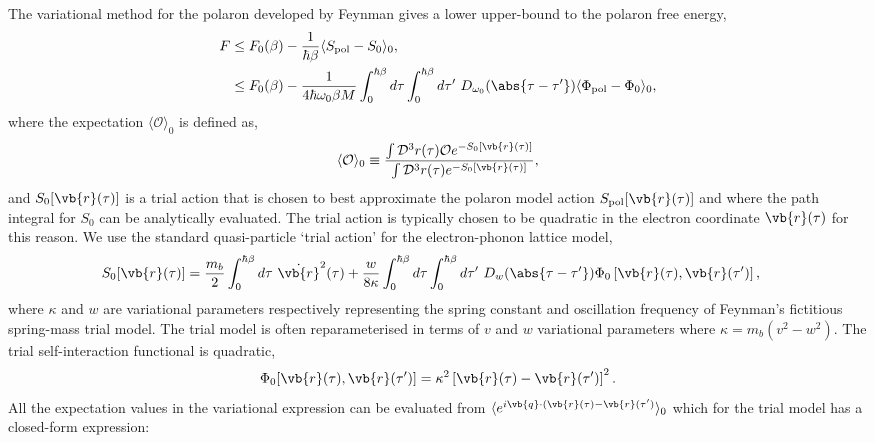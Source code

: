 The variational method for the polaron developed by Feynman gives a lower upper-bound to the polaron free energy,
\begin{equation}
    \begin{aligned}
         F &\leq F_0(\beta) - \frac{1}{\hbar\beta} \langle S_{\text{pol}} - S_{0} \rangle_0 , \\
         &\leq F_0(\beta) -\frac{1}{4\hbar\omega_0\beta M} \int_0^{\hbar\beta} d\tau \int_0^{\hbar\beta} d\tau'\ D_{\omega_0}(\abs{\tau - \tau'}) \langle \Phi_{\text{pol}} - \Phi_0 \rangle_0 ,
    \end{aligned}
\end{equation}
where the expectation $\langle \mathcal{O} \rangle_0$ is defined as,
\begin{equation}
    \langle \mathcal{O} \rangle_0 \equiv \frac{\int \mathcal{D}^3 r(\tau) \mathcal{O} e^{-S_0[\vb{r}(\tau)]}}{\int \mathcal{D}^3 r(\tau) e^{-S_0[\vb{r}(\tau)]}},
\end{equation}
and $S_0[\vb{r}(\tau)]$ is a trial action that is chosen to best approximate the polaron model action $S_{\text{pol}}[\vb{r}(\tau)]$ and where the path integral for $S_0$ can be analytically evaluated. The trial action is typically chosen to be quadratic in the electron coordinate $\vb{r}(\tau)$ for this reason. We use the standard quasi-particle `trial action' for the electron-phonon lattice model, 
\begin{equation}
    \begin{aligned}
        S_{0}[\vb{r}(\tau)] &= \frac{m_b}{2} \int_0^{\hbar\beta} d\tau\ \Dot{\vb{r}}^2(\tau) + \frac{w}{8 \kappa} \int_0^{\hbar\beta} d\tau \int_0^{\hbar\beta} d\tau'\ D_{w}(\abs{\tau - \tau'}) \Phi_0\left[\vb{r}(\tau), \vb{r}(\tau')\right] ,
    \end{aligned}
\end{equation}
where $\kappa$ and $w$ are variational parameters respectively representing the spring constant and oscillation frequency of Feynman's fictitious spring-mass trial model. The trial model is often reparameterised in terms of $v$ and $w$ variational parameters where $\kappa = m_b (v^2 - w^2)$. The trial self-interaction functional is quadratic,
\begin{equation}
    \Phi_0[\vb{r}(\tau), \vb{r}(\tau')] = \kappa^2 \left[\vb{r}(\tau) - \vb{r}(\tau')\right]^2 .
\end{equation}
All the expectation values in the variational expression can be evaluated from $\langle e^{i \vb{q} \cdot (\vb{r}(\tau) - \vb{r}(\tau')} \rangle_0$ which for the trial model has a closed-form expression:

